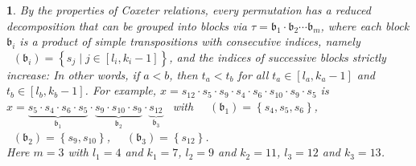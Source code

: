\documentclass[a4 paper,12pt]{article}
\newcommand{\ger}[1]{\mathfrak{#1}}
\DeclareMathOperator{\Red}{R_{\textbf{d}}}
\newtheorem{subnum}{}[numeris]
\begin{document}
\begin{subnum} 
By the properties of Coxeter relations, every permutation 
has  a reduced decomposition that can be grouped into \textit{blocks} via $\tau = \ger{b}_1 \cdot \ger{b}_2 \cdots \ger{b}_m$, where each \textit{block} $\ger{b}_i$ is a product of simple transpositions with consecutive indices, namely  $\Red(\ger{b}_i) = \left\{ s_j \mid j\in \left[l_i, k_i-1\right]\right\}$, and the indices of successive blocks strictly increase: In other words,  if $a<b$, then $t_a< t_b$ for all $t_a\in \left[l_a ,k_a-1\right]$ and $t_b\in \left[l_b, k_b-1\right]$. For example,
 $x =  s_{12}\cdot   s_5\cdot s_{9}\cdot  s_4\cdot s_6\cdot s_{10}  \cdot s_9 \cdot s_5$ is
\\[3mm]
$ x =   \underbrace{s_5\!\cdot\! s_4\!\cdot\! s_6\!\cdot\! s_5}_{\ger{b}_1}\!\cdot\! \underbrace{s_{9}\!\cdot\! s_{10}\!\cdot\! s_9}_{\ger{b}_2}\!\cdot\! \underbrace{s_{12}}_{\ger{b}_3}$   \    with  \    $\Red(\ger{b}_1)=\left\{s_{4}, s_{5},  s_{6} \right\}$,   \   $\Red(\ger{b}_2)=\left\{s_{9}, s_{10}\right\}$,    \  $\Red(\ger{b}_3)=\left\{s_{12}\right\}$.
\\[2mm]
Here $m=3$ with  $l_1=4$ and  $k_1= 7$, $l_2=9$ and  $k_2 = 11$, $l_3 = 12$ and $k_3=13$. 


\end{subnum}
\end{document}
